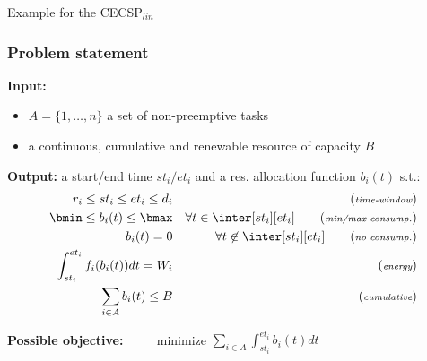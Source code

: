 \begin{frame}{Example for the CECSP$_{lin}$}
  
\end{frame}


\begin{frame}
  \frametitle{Problem statement}
  \vfill
 {\small  {\bf Input: } 
  \begin{itemize}
  \item $A=\{1,\hdots,n\}$ a set of non-preemptive tasks
  \item a continuous, cumulative and renewable resource of capacity  $B$
  \end{itemize}
  \vspace{0.5cm}
  {\bf Output:} a start/end time $st_i/et_i$ and a res. allocation function
  $b_i(t)$ s.t.:
  {\footnotesize
    \begin{align}
    r_i\le st_i\le
   et_i \le d_i & & \tag{{\it \scriptsize
                                                     time-window}}\\
    \bmin \le b_i(t) \le \bmax & & \forall t
                                                                 \in \inter[st_i][et_i] \tag{{\it \scriptsize min/max consump.}}\\
    b_i(t)=0 & &
                                               \forall t \not\in \inter[st_i][et_i] \tag{{\it \scriptsize no
                                               consump.}}\\ 
    \int_{st_i}^{et_i}f_i(b_i(t))dt=W_i
                                                 & &\tag{{\it \scriptsize energy}} \\
    \sum_{i\in A}b_i(t) \le B & & \tag{{\it
                                                                \scriptsize cumulative}}
  \end{align}
}

  \vspace{0.5cm}
{\bf Possible objective:} $\qquad $ minimize  $\sum_{i\in A}
\int_{st_i}^{et_i} b_i(t)dt $}
\end{frame}

